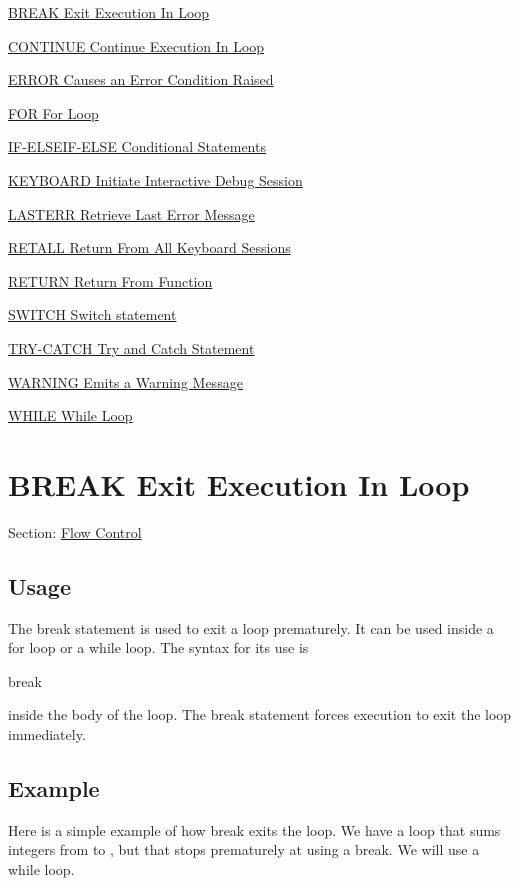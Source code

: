 
\begin{DoxyItemize}
\item \hyperlink{flow_break}{B\-R\-E\-A\-K Exit Execution In Loop}  
\item \hyperlink{flow_continue}{C\-O\-N\-T\-I\-N\-U\-E Continue Execution In Loop}  
\item \hyperlink{flow_error}{E\-R\-R\-O\-R Causes an Error Condition Raised}  
\item \hyperlink{flow_for}{F\-O\-R For Loop}  
\item \hyperlink{flow_if}{I\-F-\/\-E\-L\-S\-E\-I\-F-\/\-E\-L\-S\-E Conditional Statements}  
\item \hyperlink{flow_keyboard}{K\-E\-Y\-B\-O\-A\-R\-D Initiate Interactive Debug Session}  
\item \hyperlink{flow_lasterr}{L\-A\-S\-T\-E\-R\-R Retrieve Last Error Message}  
\item \hyperlink{flow_retall}{R\-E\-T\-A\-L\-L Return From All Keyboard Sessions}  
\item \hyperlink{flow_return}{R\-E\-T\-U\-R\-N Return From Function}  
\item \hyperlink{flow_switch}{S\-W\-I\-T\-C\-H Switch statement}  
\item \hyperlink{flow_try}{T\-R\-Y-\/\-C\-A\-T\-C\-H Try and Catch Statement}  
\item \hyperlink{flow_warning}{W\-A\-R\-N\-I\-N\-G Emits a Warning Message}  
\item \hyperlink{flow_while}{W\-H\-I\-L\-E While Loop}  
\end{DoxyItemize}\hypertarget{flow_break}{}\section{B\-R\-E\-A\-K Exit Execution In Loop}\label{flow_break}
Section\-: \hyperlink{sec_flow}{Flow Control} \hypertarget{vtkwidgets_vtkxyplotwidget_Usage}{}\subsection{Usage}\label{vtkwidgets_vtkxyplotwidget_Usage}
The {\ttfamily break} statement is used to exit a loop prematurely. It can be used inside a {\ttfamily for} loop or a {\ttfamily while} loop. The syntax for its use is \begin{DoxyVerb}   break
\end{DoxyVerb}
 inside the body of the loop. The {\ttfamily break} statement forces execution to exit the loop immediately. \hypertarget{variables_struct_Example}{}\subsection{Example}\label{variables_struct_Example}
Here is a simple example of how {\ttfamily break} exits the loop. We have a loop that sums integers from {} to {}, but that stops prematurely at {} using a {\ttfamily break}. We will use a {\ttfamily while} loop.

